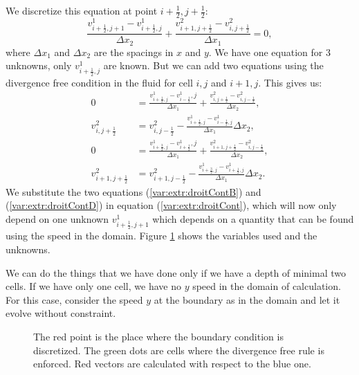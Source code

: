 We discretize this equation at point $i+\frac{1}{2},j+\frac{1}{2}$:
\begin{equation}
\label{var:extr:droitCont}
	\frac{v^{1}_{i+\frac{1}{2},j+1}-v^{1}_{i+\frac{1}{2},j}}{\Delta x_{2}}+\frac{v^{2}_{i+1,j+\frac{1}{2}}-v^{2}_{i,j+\frac{1}{2}}}{\Delta x_{1}}=0,
\end{equation}
where $\Delta x_{1}$ and $\Delta x_{2}$ are the spacings in $x$ and $y$.
We have one equation for 3 unknowns, only $v^{1}_{i+\frac{1}{2},j}$ are known.
But we can add two equations using the divergence free condition in the fluid for cell $i,j$ and $i+1,j$.
This gives us:
\begin{align}
\label{var:extr:droitContA}
	0&=\frac{v^{1}_{i+\frac{1}{2},j}-v^{1}_{i-\frac{1}{2}},j}{\Delta x_{1}}+\frac{v^{2}_{i,j+\frac{1}{2}}-v^{2}_{i,j-\frac{1}{2}}}{\Delta x_2},\\
\label{var:extr:droitContB}
	v^{2}_{i,j+\frac{1}{2}}&=v^{2}_{i,j-\frac{1}{2}}-\frac{v^{1}_{i+\frac{1}{2},j}-v^{1}_{i-\frac{1}{2},j}}{\Delta x_{1}}\Delta x_{2},\\
\label{var:extr:droitContC}
	0&=\frac{v^{1}_{i+\frac{3}{2},j}-v^{1}_{i+\frac{1}{2}},j}{\Delta x_{1}}+\frac{v^{2}_{i+1,j+\frac{1}{2}}-v^{2}_{i,j-\frac{1}{2}}}{\Delta x_2},\\
\label{var:extr:droitContD}
	v^{2}_{i+1,j+\frac{1}{2}}&=v^{2}_{i+1,j-\frac{1}{2}}-\frac{v^{1}_{i+\frac{3}{2},j}-v^{1}_{i+\frac{1}{2},j}}{\Delta x_{1}}\Delta x_{2}.
\end{align}
We substitute the two equations (\ref{var:extr:droitContB}) and (\ref{var:extr:droitContD}) in equation (\ref{var:extr:droitCont}),
which will now only depend on one unknown $v^{1}_{i+\frac{1}{2},j+1}$ which depends on a quantity that can be found using the speed in the domain.
Figure \ref{topology:extrap:plane} shows the variables used and the unknowns.

We can do the things that we have done only if we have a depth of minimal two cells.
If we have only one cell, we have no $y$ speed in the domain of calculation.
For this case, consider the speed $y$ at the boundary as in the domain and let it evolve without constraint.

\begin{figure}
\caption{The red point is the place where the boundary condition is discretized.
The green dots are cells where the divergence free rule is enforced. Red vectors are calculated with respect to the blue one.}
\label{topology:extrap:plane}
\end{figure}

